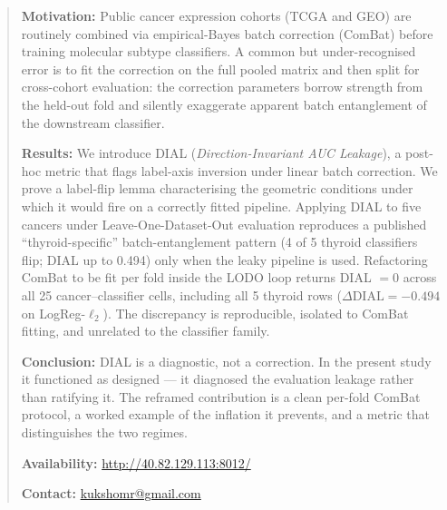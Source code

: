 \begin{abstract}

\textbf{Motivation:} Public cancer expression cohorts (TCGA and GEO)
are routinely combined via empirical-Bayes batch correction (ComBat)
before training molecular subtype classifiers. A common but
under-recognised error is to fit the correction on the full pooled
matrix and then split for cross-cohort evaluation: the correction
parameters borrow strength from the held-out fold and silently
exaggerate apparent batch entanglement of the downstream classifier.

\textbf{Results:} We introduce DIAL (\textit{Direction-Invariant AUC
Leakage}), a post-hoc metric that flags label-axis inversion under
linear batch correction. We prove a label-flip lemma characterising
the geometric conditions under which it would fire on a correctly
fitted pipeline. Applying DIAL to five cancers under
Leave-One-Dataset-Out evaluation reproduces a published
``thyroid-specific'' batch-entanglement pattern (4 of 5 thyroid
classifiers flip; DIAL up to 0.494) only when the leaky pipeline is
used. Refactoring ComBat to be fit per fold inside the LODO loop
returns DIAL $= 0$ across all 25 cancer--classifier cells, including
all 5 thyroid rows ($\Delta\mathrm{DIAL} = -0.494$ on
LogReg-$\ell_2$). The discrepancy is reproducible, isolated to
ComBat fitting, and unrelated to the classifier family.

\textbf{Conclusion:} DIAL is a diagnostic, not a correction. In the
present study it functioned as designed --- it diagnosed the
evaluation leakage rather than ratifying it. The reframed
contribution is a clean per-fold ComBat protocol, a worked example
of the inflation it prevents, and a metric that distinguishes the
two regimes.

\textbf{Availability:} \url{http://40.82.129.113:8012/}

\textbf{Contact:} \href{mailto:kukshomr@gmail.com}{kukshomr@gmail.com}

\end{abstract}
